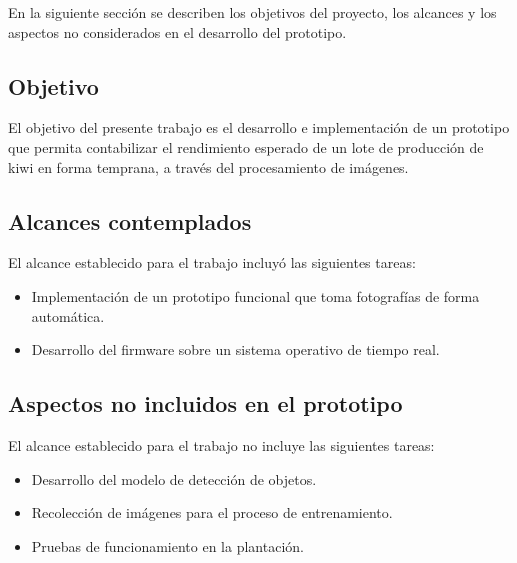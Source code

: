 En la siguiente sección se describen los objetivos del proyecto, los alcances y los aspectos no considerados en el desarrollo del prototipo.

\subsection{Objetivo}

El objetivo del presente trabajo es el desarrollo e implementación de un prototipo que permita contabilizar el rendimiento esperado de un lote de producción de kiwi en forma temprana, a través del procesamiento de imágenes.

\subsection{Alcances contemplados}
El alcance establecido para el trabajo incluyó las siguientes tareas:

\begin{itemize}
\item Implementación de un prototipo funcional que toma fotografías de forma automática.
\item Desarrollo del firmware sobre un sistema operativo de tiempo real.
\end{itemize}

\subsection{Aspectos no incluidos en el prototipo}

El alcance establecido para el trabajo no incluye las siguientes tareas:

\begin{itemize}
\item Desarrollo del modelo de detección de objetos.
\item Recolección de imágenes para el proceso de entrenamiento.
\item Pruebas de funcionamiento en la plantación.
\end{itemize}

